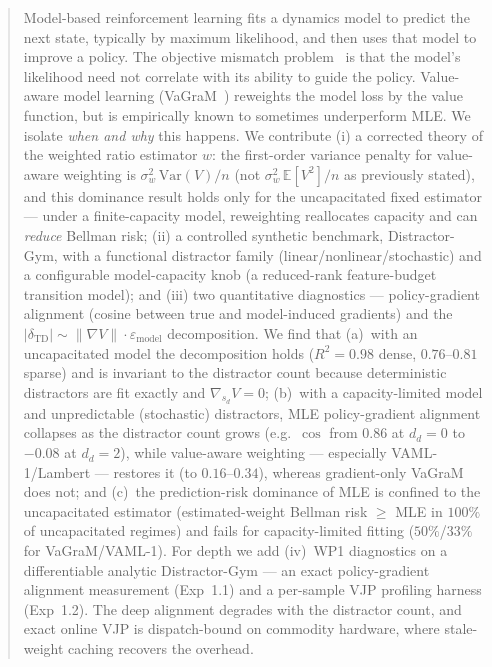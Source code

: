 \documentclass[11pt]{article}
\begin{document}
\begin{abstract}
Model-based reinforcement learning fits a dynamics model to predict the next state,
typically by maximum likelihood, and then uses that model to improve a policy. The
objective mismatch problem~\cite{lambert2020objective} is that the model's likelihood
need not correlate with its ability to guide the policy. Value-aware model learning
(VaGraM~\cite{voelcker2022vagram}) reweights the model loss by the value function, but
is empirically known to sometimes underperform MLE. We isolate \emph{when and why} this
happens. We contribute (i) a corrected theory of the weighted ratio estimator $w$: the
first-order variance penalty for value-aware weighting is
$\sigma_w^2\,\mathrm{Var}(V)/n$ (not $\sigma_w^2\,\mathbb{E}[V^2]/n$ as previously
stated), and this dominance result holds only for the uncapacitated fixed estimator ---
under a finite-capacity model, reweighting reallocates capacity and can \emph{reduce}
Bellman risk; (ii) a controlled synthetic benchmark, Distractor-Gym, with a functional
distractor family (linear/nonlinear/stochastic) and a configurable model-capacity knob
(a reduced-rank feature-budget transition model); and (iii) two quantitative
diagnostics --- policy-gradient alignment (cosine between true and model-induced
gradients) and the
$\lvert\delta_{\mathrm{TD}}\rvert \sim \lVert \nabla V\rVert \cdot \varepsilon_{\mathrm{model}}$
decomposition. We find that (a)~with an uncapacitated model the decomposition holds
($R^2 = 0.98$ dense, $0.76$--$0.81$ sparse) and is invariant to the distractor count
because deterministic distractors are fit exactly and $\nabla_{s_d} V = 0$;
(b)~with a capacity-limited model and unpredictable (stochastic) distractors, MLE
policy-gradient alignment collapses as the distractor count grows (e.g.\ $\cos$ from
$0.86$ at $d_d=0$ to $-0.08$ at $d_d=2$), while value-aware weighting --- especially
VAML-1/Lambert --- restores it (to $0.16$--$0.34$), whereas gradient-only VaGraM does
not; and (c)~the prediction-risk dominance of MLE is confined to the uncapacitated
estimator (estimated-weight Bellman risk $\ge$ MLE in $100\%$ of uncapacitated regimes)
and fails for capacity-limited fitting ($50\%$/$33\%$ for VaGraM/VAML-1). For depth we
add (iv)~WP1 diagnostics on a differentiable analytic Distractor-Gym --- an exact
policy-gradient alignment measurement (Exp~1.1) and a per-sample VJP profiling harness
(Exp~1.2). The deep alignment degrades with the distractor count, and exact online VJP is
dispatch-bound on commodity hardware, where stale-weight caching recovers the overhead.
\end{abstract}
\end{document}
